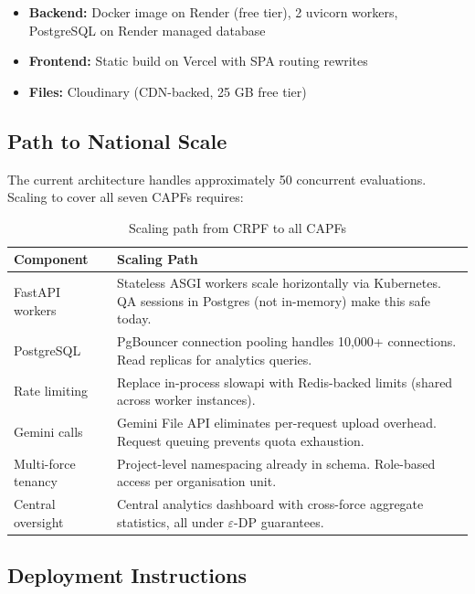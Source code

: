 \documentclass[12pt,a4paper]{article}
\begin{document}
\begin{itemize}
\item \textbf{Backend:} Docker image on Render (free tier), 2 uvicorn workers,
    PostgreSQL on Render managed database
\item \textbf{Frontend:} Static build on Vercel with SPA routing rewrites
\item \textbf{Files:} Cloudinary (CDN-backed, 25 GB free tier)
\end{itemize}

\subsection{Path to National Scale}

The current architecture handles approximately 50 concurrent evaluations. Scaling
to cover all seven CAPFs requires:

\begin{table}[H]
\centering
\begin{tabularx}{\linewidth}{@{}lX@{}}
\toprule
\textbf{Component} & \textbf{Scaling Path} \\
\midrule
FastAPI workers &
    Stateless ASGI workers scale horizontally via Kubernetes.
    QA sessions in Postgres (not in-memory) make this safe today. \\[4pt]
PostgreSQL &
    PgBouncer connection pooling handles 10,000+ connections.
    Read replicas for analytics queries. \\[4pt]
Rate limiting &
    Replace in-process slowapi with Redis-backed limits
    (shared across worker instances). \\[4pt]
Gemini calls &
    Gemini File API eliminates per-request upload overhead.
    Request queuing prevents quota exhaustion. \\[4pt]
Multi-force tenancy &
    Project-level namespacing already in schema.
    Role-based access per organisation unit. \\[4pt]
Central oversight &
    Central analytics dashboard with cross-force aggregate statistics,
    all under $\varepsilon$-DP guarantees. \\
\bottomrule
\end{tabularx}
\caption{Scaling path from CRPF to all CAPFs}
\end{table}

\subsection{Deployment Instructions}
\end{document}

